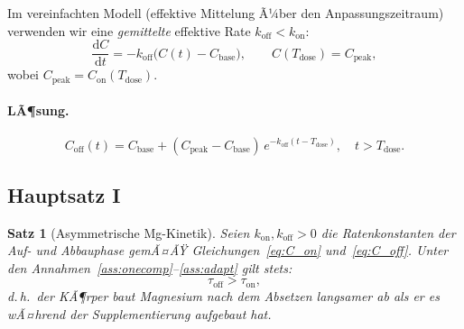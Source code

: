﻿\documentclass[12pt,a4paper]{article}
\theoremstyle{plain}
\newtheorem{theorem}{Satz}[section]
\theoremstyle{definition}
\theoremstyle{remark}
\begin{document}
Im vereinfachten Modell (effektive Mittelung Ã¼ber den Anpassungszeitraum)
verwenden wir eine \emph{gemittelte} effektive Rate $k_\text{off} < k_\text{on}$:
\begin{equation}
  \frac{\mathrm{d}C}{\mathrm{d}t} = -k_\text{off}\bigl(C(t) - C_\text{base}\bigr),
  \qquad C(T_\text{dose}) = C_\text{peak},
  \label{eq:washout}
\end{equation}
wobei $C_\text{peak} = C_\text{on}(T_\text{dose})$.

\paragraph{LÃ¶sung.}
\begin{equation}
  \boxed{C_\text{off}(t) = C_\text{base} + (C_\text{peak}-C_\text{base})\,
    e^{-k_\text{off}(t-T_\text{dose})}, \quad t > T_\text{dose}.}
  \label{eq:C_off}
\end{equation}

\subsection{Hauptsatz I}

\begin{theorem}[Asymmetrische Mg-Kinetik]
\label{thm:mg}
Seien $k_\text{on}, k_\text{off} > 0$ die Raten\-konstanten der Auf- und
Abbauphase gemÃ¤ÃŸ Gleichungen~\eqref{eq:C_on} und~\eqref{eq:C_off}. Unter
den Annahmen~\ref{ass:onecomp}--\ref{ass:adapt} gilt stets:
\begin{equation}
  \tau_\text{off} > \tau_\text{on},
  \label{eq:asymm}
\end{equation}
d.\,h.\ der KÃ¶rper baut Magnesium nach dem Absetzen \emph{langsamer} ab
als er es wÃ¤hrend der Supplementierung aufgebaut hat.
\end{theorem}
\end{document}
